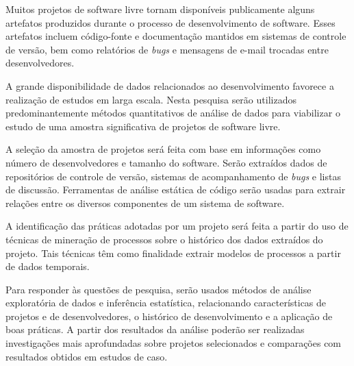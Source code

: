 \documentclass{article}
\begin{document}
Muitos projetos de software livre tornam disponíveis publicamente alguns
artefatos produzidos durante o processo de desenvolvimento de software. Esses
artefatos incluem código-fonte e documentação mantidos em sistemas de controle
de versão, bem como relatórios de \emph{bugs} e mensagens de e-mail trocadas
entre desenvolvedores. 

A grande disponibilidade de dados relacionados ao desenvolvimento favorece a
realização de estudos em larga escala. Nesta pesquisa serão utilizados
predominantemente métodos quantitativos de análise de dados para viabilizar o
estudo de uma amostra significativa de projetos de software livre.

A seleção da amostra de projetos será feita com base em informações como número
de desenvolvedores e tamanho do software. Serão extraídos dados de repositórios
de controle de versão, sistemas de acompanhamento de \emph{bugs} e listas de
discussão.  Ferramentas de análise estática de código serão usadas para extrair
relações entre os diversos componentes de um sistema de software.


A identificação das práticas adotadas por um projeto será feita a partir do uso
de técnicas de mineração de processos \cite{rubin2007} sobre o histórico dos
dados extraídos do projeto. Tais técnicas têm como finalidade extrair modelos de
processos a partir de dados temporais.

Para responder às questões de pesquisa, serão usados métodos de análise
exploratória de dados e inferência estatística, relacionando características de
projetos e de desenvolvedores, o histórico de desenvolvimento e a aplicação de
boas práticas. A partir dos resultados da análise poderão ser realizadas
investigações mais aprofundadas sobre projetos selecionados e comparações com
resultados obtidos em estudos de caso.
\end{document}
